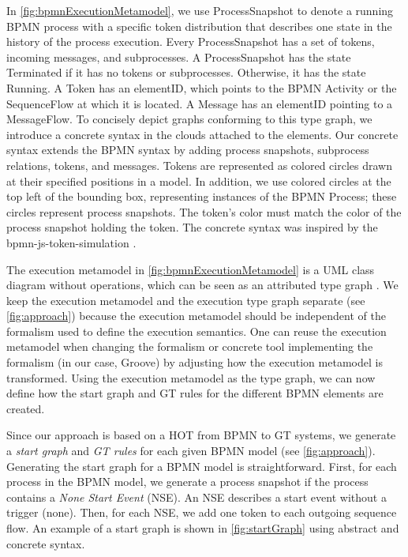 \documentclass{lmcs} %
\begin{document}
In \autoref{fig:bpmnExecutionMetamodel}, we use \textsf{ProcessSnapshot} to denote a running BPMN process with a specific token distribution that describes one state in the history of the process execution.
Every \textsf{ProcessSnapshot} has a set of \textsf{tokens}, incoming \textsf{messages}, and \textsf{subprocesses}.
A \textsf{ProcessSnapshot} has the state \textsf{Terminated} if it has no \textsf{tokens} or \textsf{subprocesses}.
Otherwise, it has the state \textsf{Running}.
A \textsf{Token} has an \textsf{elementID}, which points to the BPMN \textsf{Activity} or the \textsf{SequenceFlow} at which it is located.
A \textsf{Message} has an \textsf{elementID} pointing to a \textsf{MessageFlow}.
To concisely depict graphs conforming to this type graph, we introduce a concrete syntax in the clouds attached to the elements.
Our concrete syntax extends the BPMN syntax by adding process snapshots, subprocess relations, tokens, and messages.
Tokens are represented as colored circles drawn at their specified positions in a model.
In addition, we use colored circles at the top left of the bounding box, representing instances of the BPMN \textsf{Process}; these circles represent process snapshots.
The token's color must match the color of the process snapshot holding the token.
The concrete syntax was inspired by the bpmn-js-token-simulation \cite{camundaservicesgmbhBpmnjsTokenSimulation2023}.

The execution metamodel in \autoref{fig:bpmnExecutionMetamodel} is a UML class diagram without operations, which can be seen as an attributed type graph \cite{heckelGraphTransformationSoftware2020}.
We keep the execution metamodel and the execution type graph separate (see \autoref{fig:approach}) because the execution metamodel should be independent of the formalism used to define the execution semantics.
One can reuse the execution metamodel when changing the formalism or concrete tool implementing the formalism (in our case, Groove) by adjusting how the execution metamodel is transformed.
Using the execution metamodel as the type graph, we can now define how the start graph and GT rules for the different BPMN elements are created.

Since our approach is based on a HOT from BPMN to GT systems, we generate a \textit{start graph} and \textit{GT rules} for each given BPMN model (see \autoref{fig:approach}).
Generating the start graph for a BPMN model is straightforward.
First, for each process in the BPMN model, we generate a process snapshot if the process contains a \textit{None Start Event} (NSE).
An NSE describes a start event without a trigger (none).
Then, for each NSE, we add one token to each outgoing sequence flow.
An example of a start graph is shown in \autoref{fig:startGraph} using abstract and concrete syntax.
\end{document}
